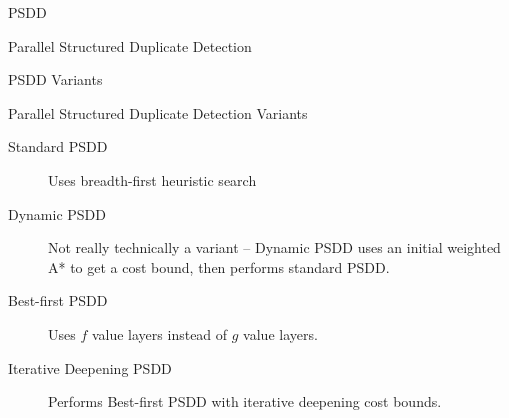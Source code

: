 \documentclass[style=unh]{powerdot}
\begin{document}
\begin{slide}{PSDD}
  \vspace{.2in}
  \begin{center}
    Parallel Structured Duplicate Detection
  \end{center}

\end{slide}

\begin{slide}{PSDD Variants}
  \vspace{.2in}
  \begin{center}
    Parallel Structured Duplicate Detection Variants
  \end{center}

  \begin{description}

  \item[Standard PSDD]
    Uses breadth-first heuristic search
  \item[Dynamic PSDD]
    Not really technically a variant -- Dynamic PSDD uses an initial
    weighted A* to get a cost bound, then performs standard PSDD.
  \item[Best-first PSDD]
    Uses $f$ value layers instead of $g$ value layers.
  \item[Iterative Deepening PSDD]
    Performs Best-first PSDD with iterative deepening cost bounds.
  \end{description}

\end{slide}
\end{document}
